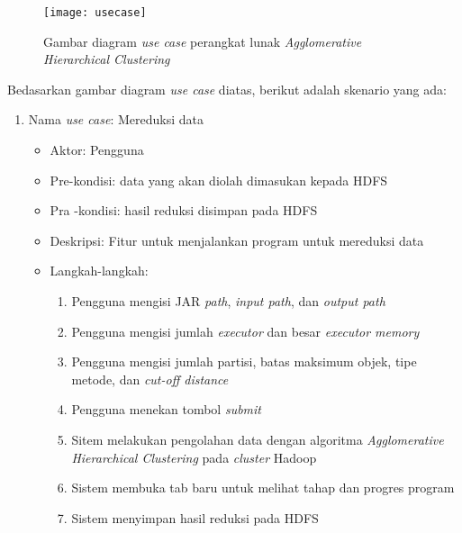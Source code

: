 \begin{figure}[H]
    \centering  
    \texttt{[image: usecase]}  
    \caption[Gambar diagram \textit{use case} perangkat lunak \textit{Agglomerative Hierarchical Clustering}]{Gambar diagram \textit{use case} perangkat lunak \textit{Agglomerative Hierarchical Clustering}} 
    \label{fig:usecase} 
\end{figure}

Bedasarkan gambar diagram \textit{use case} diatas, berikut adalah skenario yang ada:

\begin{enumerate}

\item Nama \textit{use case}: Mereduksi data

\begin{itemize}
\item Aktor: Pengguna

\item Pre-kondisi: data yang akan diolah dimasukan kepada HDFS

\item Pra -kondisi: hasil reduksi disimpan pada HDFS

\item Deskripsi: Fitur untuk menjalankan program untuk mereduksi data

\item Langkah-langkah:

\begin{enumerate}

\item Pengguna mengisi JAR \textit{path}, \textit{input path}, dan \textit{output path}

\item Pengguna mengisi jumlah \textit{executor} dan besar \textit{executor memory}

\item Pengguna mengisi jumlah partisi, batas maksimum objek, tipe metode, dan \textit{cut-off distance} 

\item Pengguna menekan tombol \textit{submit}

\item Sitem melakukan pengolahan data dengan algoritma \textit{Agglomerative Hierarchical Clustering} pada \textit{cluster} Hadoop

\item Sistem membuka tab baru untuk melihat tahap dan progres program

\item Sistem menyimpan hasil reduksi pada HDFS
\end{enumerate}


\end{itemize}
\end{enumerate}
